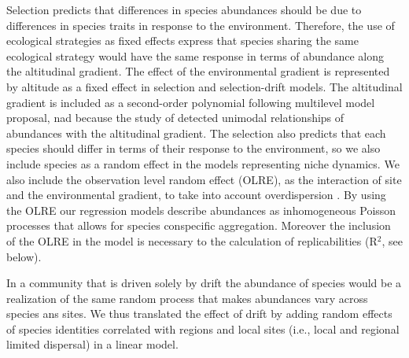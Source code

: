 \documentclass[12pt]{article}
\begin{document}
Selection predicts that differences in species abundances should be
due to differences in species traits in response to the
environment. Therefore, the use of ecological strategies as fixed
effects %
express that species sharing the same ecological strategy would have
the same %
response in terms of abundance along the altitudinal gradient. The
effect of the environmental gradient is represented by altitude as a
fixed effect in selection and selection-drift models. The altitudinal
gradient is included as a second-order polynomial following
\cite{Jamil2013a, Jamil2013} multilevel model proposal, nad because
the study of \cite{Paciencia2008} detected unimodal relationships of
abundances with the altitudinal gradient. The selection also predicts that
each species should differ in terms of their response to the
environment, so we also include species as a random effect in the
models representing niche dynamics. We also include the observation
level random effect (OLRE), as the interaction of site and the
environmental gradient, to take into account overdispersion
\citep{Bolker2009}.  By using the OLRE our regression models describe
abundances as inhomogeneous Poisson processes that allows for species
conspecific aggregation. Moreover the inclusion of the OLRE in the
model is necessary to the calculation of replicabilities (R{$^2$}, see
below).

In a community that is driven solely by drift the abundance of species would
be a realization of the same random process that makes abundances vary
across species ans sites. We thus translated the effect of drift by adding
random effects of species identities correlated with
regions and local
sites (i.e., local and regional limited dispersal) in a linear
model. %
\end{document}
